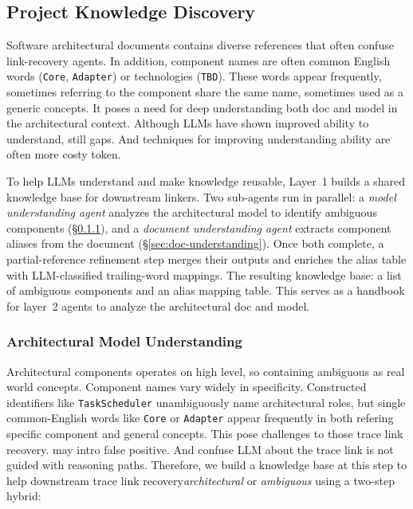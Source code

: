 \subsection{Project Knowledge Discovery}
Software architectural documents contains diverse references that often confuse link-recovery agents.
In addition, component names are often common English words (\texttt{Core}, \texttt{Adapter}) or technologies (\texttt{TBD}).
These words appear frequently, sometimes referring to the component share the same name, sometimes used as a generic concepts.
It poses a need for deep understanding both doc and model in the architectural context.
Although \acp{LLM} have shown improved ability to understand, still gaps. 
And techniques for improving understanding ability are often more costy token.\cite{cite }


To help \acp{LLM} understand and make knowledge reusable,  Layer~1 builds a shared knowledge base for downstream linkers.
Two sub-agents run in parallel: a \emph{model understanding agent} analyzes the architectural model to identify ambiguous components
(\S\ref{sec:model-understanding}), and a \emph{document understanding agent} extracts component aliases from the document
(\S\ref{sec:doc-understanding}).
Once both complete, a partial-reference refinement step merges their outputs and enriches the alias table with LLM-classified trailing-word mappings.
The resulting knowledge base: a list of ambiguous components and an alias mapping table.
This serves as a handbook for layer~2 agents to analyze the architectural doc and model.

\subsubsection{Architectural Model Understanding}\label{sec:model-understanding}
Architectural components operates on high level, so containing ambiguous as real world concepts.
Component names vary widely in specificity.
Constructed identifiers like \texttt{TaskScheduler} unambiguously name architectural roles, 
but single common-English words like \texttt{Core} or \texttt{Adapter} appear frequently in both refering specific component and general concepts.
This pose challenges to those trace link recovery. may intro false positive. 
And confuse LLM about the trace link is not guided with reasoning paths. 
Therefore, we build a knowledge base at this step to help downstream trace link recovery\emph{architectural}
or \emph{ambiguous} using a two-step hybrid:

